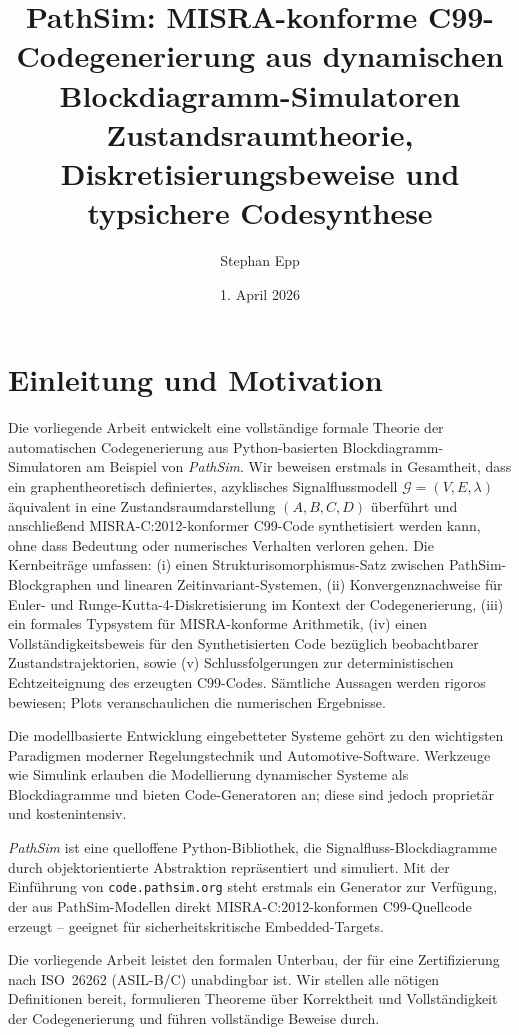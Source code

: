 ﻿\documentclass[12pt,a4paper]{article}
\title{
	\textbf{PathSim: MISRA-konforme C99-Codegenerierung aus dynamischen Blockdiagramm-Simulatoren}\\{\large Zustandsraumtheorie, Diskretisierungsbeweise und typsichere Code\-synthese}
}
\author{Stephan Epp}
\date{1. April 2026}
\theoremstyle{definition}
\begin{document}
\maketitle
\tableofcontents
\newpage


\section{Einleitung und Motivation}

Die vorliegende Arbeit entwickelt eine vollständige formale Theorie der automatischen
Codegenerierung aus Python-basierten Blockdiagramm-Simulatoren am Beispiel von
\emph{PathSim}. Wir beweisen erstmals in Gesamtheit, dass ein graphentheoretisch
definiertes, azyklisches Signalflussmodell $\mathcal{G}=(V,E,\lambda)$ äquivalent
in eine Zustandsraumdarstellung $(A,B,C,D)$ überführt und anschlie\ss{}end
MISRA-C:2012-konformer C99-Code synthetisiert werden kann, ohne dass Bedeutung
oder numerisches Verhalten verloren gehen. Die Kernbeiträge umfassen:
(i) einen Strukturisomorphismus-Satz zwischen PathSim-Blockgraphen und linearen
Zeitinvariant-Systemen,
(ii) Konvergenznachweise für Euler- und Runge-Kutta-4-Diskretisierung im
Kontext der Code\-generierung,
(iii) ein formales Typsystem für MISRA-konforme Arithmetik,
(iv) einen Vollständigkeitsbeweis für den Synthetisierten Code bezüglich
beobachtbarer Zustandstrajektorien, sowie
(v) Schlussfolgerungen zur deterministischen Echtzeiteignung des erzeugten C99-Codes.
Sämtliche Aussagen werden rigoros bewiesen; Plots veranschaulichen die
numerischen Ergebnisse.

Die modellbasierte Entwicklung eingebetteter Systeme gehört zu den wichtigsten
Paradigmen moderner Regelungstechnik und Automotive-Software. Werkzeuge wie
Simulink erlauben die Modellierung dynamischer Systeme als Blockdiagramme und
bieten Code-Generatoren an; diese sind jedoch proprietär und kostenintensiv.

\emph{PathSim} \cite{pathsim2024} ist eine quelloffene Python-Bibliothek, die
Signalfluss-Blockdiagramme durch objektorientierte Abstraktion repräsentiert
und simuliert. Mit der Einführung von \texttt{code.pathsim.org} steht erstmals
ein Generator zur Verfügung, der aus PathSim-Modellen direkt MISRA-C:2012-konformen
C99-Quellcode erzeugt -- geeignet für sicherheitskritische Embedded-Targets.

Die vorliegende Arbeit leistet den formalen Unterbau, der für eine Zertifizierung
nach ISO~26262 (ASIL-B/C) unabdingbar ist. Wir stellen alle nötigen Definitionen
bereit, formulieren Theoreme über Korrektheit und Vollständigkeit der
Code\-generierung und führen vollständige Beweise durch.
\end{document}
